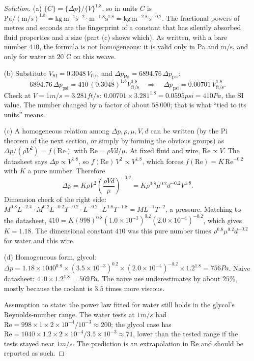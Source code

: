 \begin{proof}[Solution]
(a) $\{C\} = \{\Delta p\}/\{V\}^{1.8}$, so in units $C$ is $\mathrm{Pa}/(\mathrm{m/s})^{1.8} = \mathrm{kg\,m^{-1}s^{-2}} \cdot \mathrm{m^{-1.8}s^{1.8}} = \mathrm{kg\,m^{-2.8}\,s^{-0.2}}$. The fractional powers of metres and seconds are the fingerprint of a constant that has silently absorbed fluid properties and a size (part (c) shows which). As written, with a bare number $410$, the formula is not homogeneous: it is valid only in Pa and m/s, and only for water at $20^\circ$C on this weave.

(b) Substitute $V_{\text{SI}} = 0.3048\, V_{\text{ft/s}}$ and $\Delta p_{\text{Pa}} = 6894.76\, \Delta p_{\text{psi}}$:
\[
6894.76\, \Delta p_{\text{psi}} = 410\, (0.3048)^{1.8} V_{\text{ft/s}}^{1.8}
\quad\Longrightarrow\quad
\Delta p_{\text{psi}} = 0.00701\, V_{\text{ft/s}}^{1.8}.
\]
Check at $V = 1\unit{m/s} = 3.281\unit{ft/s}$: $0.00701 \times 3.281^{1.8} = 0.0595\unit{psi} = 410\unit{Pa}$, the SI value. The number changed by a factor of about $58\,000$; that is what ``tied to its units'' means.

(c) A homogeneous relation among $\Delta p, \rho, \mu, V, d$ can be written (by the Pi theorem of the next section, or simply by forming the obvious groups) as $\Delta p/(\rho V^2) = f(\mathrm{Re})$ with $\mathrm{Re} = \rho V d/\mu$. At fixed fluid and wire, $\mathrm{Re} \propto V$. The datasheet says $\Delta p \propto V^{1.8}$, so $f(\mathrm{Re})\, V^2 \propto V^{1.8}$, which forces $f(\mathrm{Re}) = K\,\mathrm{Re}^{-0.2}$ with $K$ a pure number. Therefore
\[
\Delta p = K \rho V^2 \left(\frac{\rho V d}{\mu}\right)^{-0.2} = K \rho^{0.8} \mu^{0.2} d^{-0.2} V^{1.8}.
\]
Dimension check of the right side: $M^{0.8}L^{-2.4} \cdot M^{0.2}L^{-0.2}T^{-0.2} \cdot L^{-0.2} \cdot L^{1.8}T^{-1.8} = ML^{-1}T^{-2}$, a pressure. Matching to the datasheet, $410 = K (998)^{0.8} (1.0\times10^{-3})^{0.2} (2.0\times10^{-4})^{-0.2}$, which gives $K = 1.18$. The dimensional constant $410$ was this pure number times $\rho^{0.8}\mu^{0.2}d^{-0.2}$ for water and this wire.

(d) Homogeneous form, glycol: $\Delta p = 1.18 \times 1040^{0.8} \times (3.5\times10^{-3})^{0.2} \times (2.0\times10^{-4})^{-0.2} \times 1.2^{1.8} = 756\unit{Pa}$. Naive datasheet: $410 \times 1.2^{1.8} = 569\unit{Pa}$. The naive use underestimates by about $25\%$, mostly because the coolant is $3.5$ times more viscous.

Assumption to state: the power law fitted for water still holds in the glycol's Reynolds-number range. The water tests at $1\unit{m/s}$ had $\mathrm{Re} = 998 \times 1 \times 2\times10^{-4}/10^{-3} \approx 200$; the glycol case has $\mathrm{Re} = 1040 \times 1.2 \times 2\times10^{-4}/3.5\times10^{-3} \approx 71$, lower than the tested range if the tests stayed near $1\unit{m/s}$. The prediction is an extrapolation in $\mathrm{Re}$ and should be reported as such.
\end{proof}

